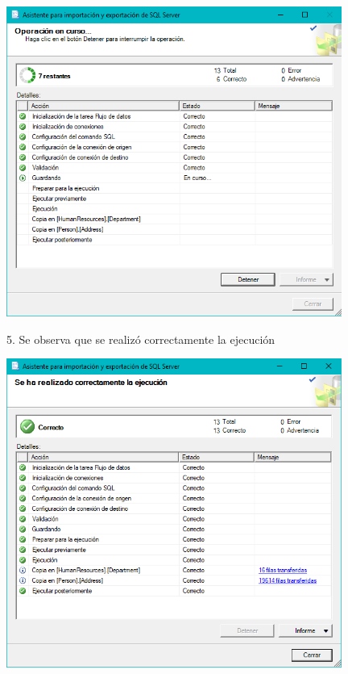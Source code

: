 	\begin{center}
	\includegraphics[width=11cm]{./Imagenes/img11}
	\end{center}	
5. Se observa que se realizó correctamente  la ejecución\\
	\begin{center}
	\includegraphics[width=11cm]{./Imagenes/img12}
	\end{center}	